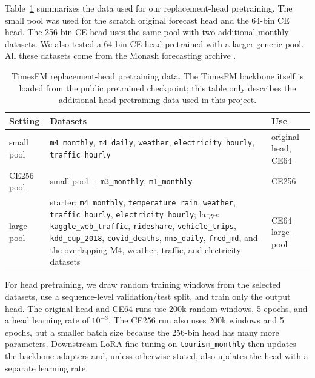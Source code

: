 \documentclass{article}
\begin{document}
Table~\ref{tab:timesfm-pretrain-data} summarizes the data used for our
replacement-head pretraining.  The small pool was used for the scratch original
forecast head and the 64-bin CE head.  The 256-bin CE head uses the same pool
with two additional monthly datasets.  We also tested a 64-bin CE head pretrained
with a larger generic pool.  All these datasets come from the Monash forecasting
archive \citep{godahewa2021monash}.

\begin{table}[H]
    \centering
    \caption{TimesFM replacement-head pretraining data.  The TimesFM backbone
    itself is loaded from the public pretrained checkpoint; this table only
    describes the additional head-pretraining data used in this project.}
    \label{tab:timesfm-pretrain-data}
    \scriptsize
    \begin{tabular}{p{}p{}p{}}
        \toprule
        Setting & Datasets & Use \\
        \midrule
        small pool &
        \texttt{m4\_monthly}, \texttt{m4\_daily}, \texttt{weather},
        \texttt{electricity\_hourly}, \texttt{traffic\_hourly} &
        original head, CE64 \\
        CE256 pool &
        small pool + \texttt{m3\_monthly}, \texttt{m1\_monthly} &
        CE256 \\
        large pool &
        starter: \texttt{m4\_monthly}, \texttt{temperature\_rain},
        \texttt{weather}, \texttt{traffic\_hourly},
        \texttt{electricity\_hourly}; large: \texttt{kaggle\_web\_traffic},
        \texttt{rideshare}, \texttt{vehicle\_trips}, \texttt{kdd\_cup\_2018},
        \texttt{covid\_deaths}, \texttt{nn5\_daily}, \texttt{fred\_md}, and
        the overlapping M4, weather, traffic, and electricity datasets &
        CE64 large-pool \\
        \bottomrule
    \end{tabular}
\end{table}

For head pretraining, we draw random training windows from the selected
datasets, use a sequence-level validation/test split, and train only the output
head.  The original-head and CE64 runs use 200k random windows, 5 epochs, and a
head learning rate of $10^{-3}$.  The CE256 run also uses 200k windows and 5
epochs, but a smaller batch size because the 256-bin head has many more
parameters.  Downstream LoRA fine-tuning on \texttt{tourism\_monthly} then
updates the backbone adapters and, unless otherwise stated, also updates the
head with a separate learning rate.
\end{document}
